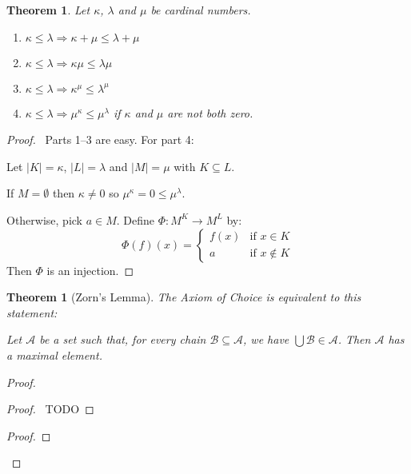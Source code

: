 \documentclass{article}
\let\qed\relax
\newtheorem{theorem}[axiom]{Theorem}
\theoremstyle{definition}
\newcommand{\dom}{\ensuremath{\operatorname{dom}}}
\begin{document}
    \begin{theorem}
        Let $\kappa$, $\lambda$ and $\mu$ be cardinal numbers.
        \begin{enumerate}
            \item $\kappa \leq \lambda \Rightarrow \kappa + \mu \leq \lambda + \mu$
            \item $\kappa \leq \lambda \Rightarrow \kappa \mu \leq \lambda \mu$
            \item $\kappa \leq \lambda \Rightarrow \kappa^\mu \leq \lambda^\mu$
            \item $\kappa \leq \lambda \Rightarrow \mu^\kappa \leq \mu^\lambda$ if $\kappa$ and $\mu$
            are not both zero.
        \end{enumerate}
    \end{theorem}

    \begin{proof}
        \pf\ Parts 1--3 are easy. For part 4:
        
        Let $|K| = \kappa$, $|L| = \lambda$ and $|M| = \mu$ with $K \subseteq L$.

        If $M = \emptyset$ then $\kappa \neq 0$ so $\mu^\kappa = 0 \leq \mu^\lambda$.

        Otherwise, pick $a \in M$. Define $\Phi : M^K \rightarrow M^L$ by:
        \[ \Phi(f)(x) = \begin{cases}
            f(x) & \text{if } x \in K \\
            a & \text{if } x \notin K
        \end{cases} \]
        Then $\Phi$ is an injection. \qed
    \end{proof}

    \begin{theorem}[Zorn's Lemma]
        The Axiom of Choice is equivalent to this statement:

        Let $\mathcal{A}$ be a set such that, for every chain $\mathcal{B} \subseteq \mathcal{A}$,
        we have $\bigcup \mathcal{B} \in \mathcal{A}$. Then $\mathcal{A}$ has a maximal element.
    \end{theorem}

    \begin{proof}
        \pf
        \begin{proof}
            \pf\ TODO
        \end{proof}
        \begin{proof}
            \step{f}{$\dom F = \dom R$}
        \end{proof}
        \qed
    \end{proof}
\end{document}
